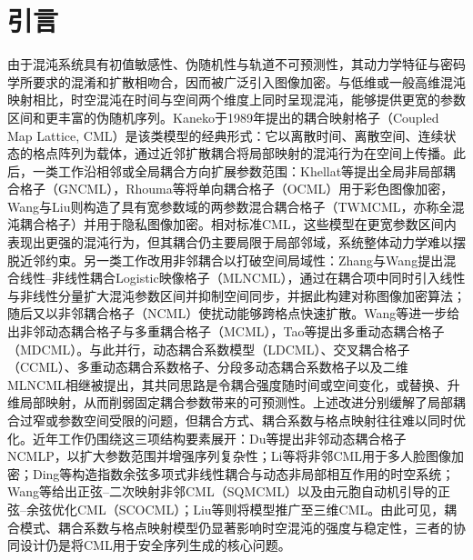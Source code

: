 \section{引言}
\label{sec:intro}

由于混沌系统具有初值敏感性、伪随机性与轨道不可预测性，其动力学特征与密码学所要求的混淆和扩散相吻合，因而被广泛引入图像加密\cite{Chen2004CatMaps,SaberiKamarposhti2024Survey}。与低维或一般高维混沌映射相比，时空混沌在时间与空间两个维度上同时呈现混沌，能够提供更宽的参数区间和更丰富的伪随机序列\cite{Wang2020MixedMCML}。Kaneko于1989年提出的耦合映射格子（Coupled Map Lattice, CML）是该类模型的经典形式：它以离散时间、离散空间、连续状态的格点阵列为载体，通过近邻扩散耦合将局部映射的混沌行为在空间上传播\cite{Kaneko1989CML}。此后，一类工作沿相邻或全局耦合方向扩展参数范围：Khellat等提出全局非局部耦合格子（GNCML）\cite{Khellat2011GNCML}，Rhouma等将单向耦合格子（OCML）用于彩色图像加密\cite{Rhouma2009OCML}，Wang与Liu则构造了具有宽参数域的两参数混合耦合格子（TWMCML，亦称全混沌耦合格子）并用于隐私图像加密\cite{Wang2022TWMCML}。相对标准CML，这些模型在更宽参数区间内表现出更强的混沌行为，但其耦合仍主要局限于局部邻域，系统整体动力学难以摆脱近邻约束。另一类工作改用非邻耦合以打破空间局域性：Zhang与Wang提出混合线性--非线性耦合Logistic映像格子（MLNCML），通过在耦合项中同时引入线性与非线性分量扩大混沌参数区间并抑制空间同步，并据此构建对称图像加密算法\cite{Zhang2014MLNCML,Zhang2014MLNCMLEnc}；随后又以非邻耦合格子（NCML）使扰动能够跨格点快速扩散\cite{Zhang2015NCML}。Wang等进一步给出非邻动态耦合格子\cite{Wang2019NDCML}与多重耦合格子（MCML）\cite{Wang2019MCML}，Tao等提出多重动态耦合格子（MDCML）\cite{Tao2020MDCML}。与此并行，动态耦合系数模型（LDCML）\cite{Wang2018LDCML}、交叉耦合格子（CCML）\cite{Wang2020CCML}、多重动态耦合系数格子\cite{Wang2021MDCML}、分段多动态耦合系数格子\cite{Wang2021PCML}以及二维MLNCML\cite{Zhang20182DMLNCML}相继被提出，其共同思路是令耦合强度随时间或空间变化，或替换、升维局部映射，从而削弱固定耦合参数带来的可预测性。上述改进分别缓解了局部耦合过窄或参数空间受限的问题，但耦合方式、耦合系数与格点映射往往难以同时优化。近年工作仍围绕这三项结构要素展开：Du等提出非邻动态耦合格子NCMLP，以扩大参数范围并增强序列复杂性\cite{Du2024NCMLP}；Li等将非邻CML用于多人脸图像加密\cite{Li2025FaceNCML}；Ding等构造指数余弦多项式非线性耦合与动态非局部相互作用的时空系统\cite{Ding2026ECPNC}；Wang等给出正弦--二次映射非邻CML（SQMCML）以及由元胞自动机引导的正弦--余弦优化CML（SCOCML）\cite{Wang2026SQMCML,Wang2025SCOCML}；Liu等则将模型推广至三维CML\cite{Liu20263DCML}。由此可见，耦合模式、耦合系数与格点映射模型仍显著影响时空混沌的强度与稳定性，三者的协同设计仍是将CML用于安全序列生成的核心问题。

